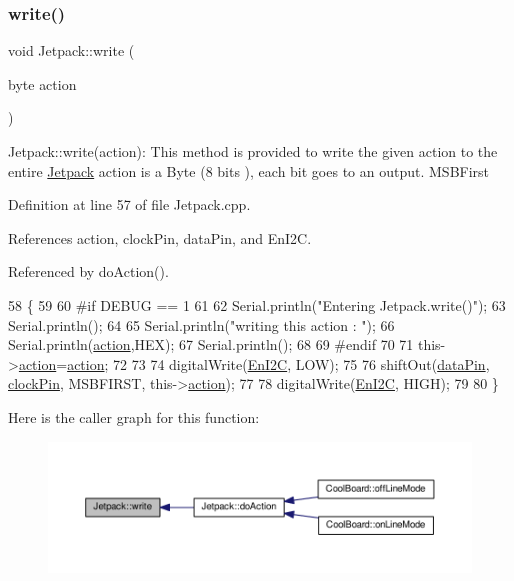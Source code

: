 \subsubsection{\texorpdfstring{write()}{write()}}
{\footnotesize\ttfamily void Jetpack\+::write (\begin{DoxyParamCaption}\item[{byte}]{action }\end{DoxyParamCaption})}

Jetpack\+::write(action)\+: This method is provided to write the given action to the entire \hyperlink{classJetpack}{Jetpack} action is a Byte (8 bits ), each bit goes to an output. M\+S\+B\+First 

Definition at line 57 of file Jetpack.\+cpp.



References action, clock\+Pin, data\+Pin, and En\+I2C.



Referenced by do\+Action().


\begin{DoxyCode}
58 \{
59 
60 \textcolor{preprocessor}{#if DEBUG == 1}
61 
62     Serial.println(\textcolor{stringliteral}{"Entering Jetpack.write()"});
63     Serial.println();
64 
65     Serial.println(\textcolor{stringliteral}{"writing this action : "});
66     Serial.println(\hyperlink{classJetpack_aca3142925a7b0834b34ae91d26af7765}{action},HEX);
67     Serial.println();
68 
69 \textcolor{preprocessor}{#endif }
70 
71     this->\hyperlink{classJetpack_aca3142925a7b0834b34ae91d26af7765}{action}=\hyperlink{classJetpack_aca3142925a7b0834b34ae91d26af7765}{action};
72 
73     
74     digitalWrite(\hyperlink{classJetpack_a81df984fb4cea98c71aa1a1cfcdfe814}{EnI2C}, LOW);
75     
76     shiftOut(\hyperlink{classJetpack_a3d669a56e93c71dd25f970d4ed7d0c00}{dataPin}, \hyperlink{classJetpack_a58ebb991f358f3ae94e82148b0221b5a}{clockPin}, MSBFIRST, this->\hyperlink{classJetpack_aca3142925a7b0834b34ae91d26af7765}{action});
77 
78     digitalWrite(\hyperlink{classJetpack_a81df984fb4cea98c71aa1a1cfcdfe814}{EnI2C}, HIGH);
79 
80 \}   
\end{DoxyCode}
Here is the caller graph for this function\+:\nopagebreak
\begin{figure}[H]
\begin{center}
\leavevmode
\includegraphics[width=350pt]{classJetpack_a338f1af8cbc6504ac69b47c7328569b5_icgraph}
\end{center}
\end{figure}
\mbox{\label{classJetpack_a79ae7bc3c1828a0551a7c005c4f8bd00}} 

